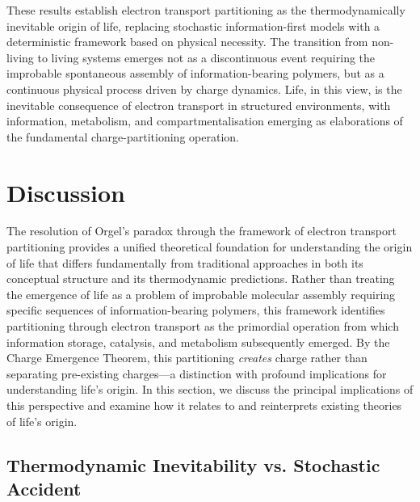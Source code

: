 \documentclass[12pt,a4paper]{article}
\begin{document}
These results establish electron transport partitioning as the thermodynamically inevitable origin of life, replacing stochastic information-first models with a deterministic framework based on physical necessity. The transition from non-living to living systems emerges not as a discontinuous event requiring the improbable spontaneous assembly of information-bearing polymers, but as a continuous physical process driven by charge dynamics. Life, in this view, is the inevitable consequence of electron transport in structured environments, with information, metabolism, and compartmentalisation emerging as elaborations of the fundamental charge-partitioning operation.















\section{Discussion}
\label{sec:discussion}

The resolution of Orgel's paradox through the framework of electron transport partitioning provides a unified theoretical foundation for understanding the origin of life that differs fundamentally from traditional approaches in both its conceptual structure and its thermodynamic predictions. Rather than treating the emergence of life as a problem of improbable molecular assembly requiring specific sequences of information-bearing polymers, this framework identifies partitioning through electron transport as the primordial operation from which information storage, catalysis, and metabolism subsequently emerged. By the Charge Emergence Theorem, this partitioning \emph{creates} charge rather than separating pre-existing charges---a distinction with profound implications for understanding life's origin. In this section, we discuss the principal implications of this perspective and examine how it relates to and reinterprets existing theories of life's origin.

\subsection{Thermodynamic Inevitability vs. Stochastic Accident}
\end{document}
